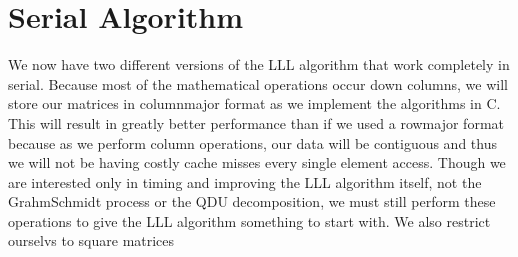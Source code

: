 \documentclass[12pt]{article}
\numberwithin{equation}{section}
\numberwithin{table}{section}
\numberwithin{figure}{section}
\begin{document}
\section{Serial Algorithm}
We now have two different versions of the LLL algorithm that work completely in serial. Because most of the mathematical operations occur down columns, we will store our matrices in column\-major format as we implement the algorithms in C. This will result in greatly better performance than if we used a row\-major format because as we perform column operations, our data will be contiguous and thus we will not be having costly cache misses every single element access. Though we are interested only in timing and improving the LLL algorithm itself, not the Grahm\-Schmidt process or the QDU decomposition, we must still perform these operations to give the LLL algorithm something to start with. We also restrict ourselvs to square matrices

\pagebreak

\end{document}
